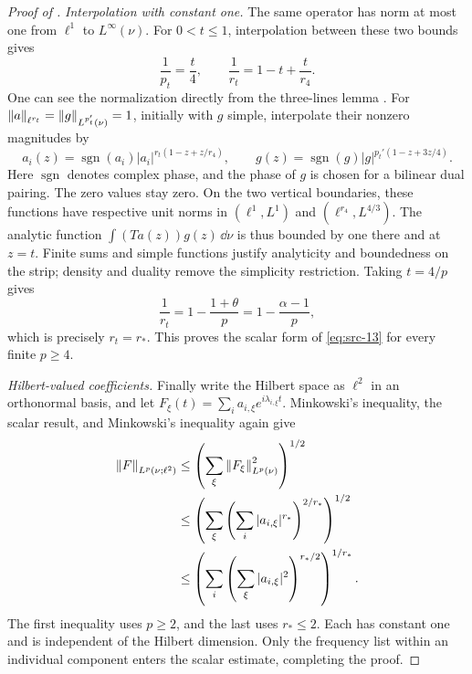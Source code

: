 \begin{proof}[Proof of ]
\emph{Interpolation with constant one.} The same
operator has norm at most one from \(\ell^1\) to \(L^\infty(\nu)\).
For \(0<t\le1\), interpolation between these two bounds gives
\[
 \frac1{p_t}=\frac t4,
 \qquad
 \frac1{r_t}=1-t+\frac t{r_4}.
\]
One can see the normalization directly from the three-lines lemma
\cite[Lemma~3.3, p.~57]{Hajlasz2012}.
For \(\left\|a\right\|_{\ell^{r_t}}=\left\|g\right\|_{L^{p_t'}(\nu)}=1\), initially
with \(g\) simple, interpolate their nonzero magnitudes by
\[
 a_i(z)=\operatorname{sgn}(a_i)
          |a_i|^{r_t(1-z+z/r_4)},
 \qquad
 g(z)=\operatorname{sgn}(g)
          |g|^{p_t'(1-z+3z/4)}.
\]
Here \(\operatorname{sgn}\) denotes complex phase, and the phase of
\(g\) is chosen for a bilinear dual pairing.  The zero values stay zero.
On the two vertical boundaries, these functions have respective unit
norms in \((\ell^1,L^1)\) and \((\ell^{r_4},L^{4/3})\).
The analytic function \(\int (Ta(z))g(z)\,\dd\nu\) is thus bounded by
one there and at \(z=t\).  Finite sums and simple functions justify
analyticity and boundedness on the strip; density and duality remove
the simplicity restriction.  Taking \(t=4/p\) gives
\[
 \frac1{r_t}
 =1-\frac{1+\theta}{p}
 =1-\frac{\alpha-1}{p},
\]
which is precisely \(r_t=r_*\).  This proves the scalar form of
\eqref{eq:src-13} for every finite \(p\ge4\).

\emph{Hilbert-valued coefficients.}
Finally write the Hilbert space as \(\ell^2\) in an orthonormal basis,
and let \(F_\xi(t)=\sum_i a_{i,\xi}e^{i\lambda_{i,\xi}t}\).
Minkowski's inequality, the scalar result, and Minkowski's inequality
again give
\begin{align*}
 \left\|F\right\|_{L^p(\nu;\ell^2)}
 &\le\left(\sum_\xi\left\|F_\xi\right\|_{L^p(\nu)}^2\right)^{1/2}\\
 &\le\left(\sum_\xi
          \left(\sum_i|a_{i,\xi}|^{r_*}\right)^{2/r_*}
            \right)^{1/2}\\
 &\le\left(\sum_i
          \left(\sum_\xi|a_{i,\xi}|^2\right)^{r_*/2}
            \right)^{1/r_*}.
\end{align*}
The first inequality uses \(p\ge2\), and the last uses \(r_*\le2\).
Each has constant one and is independent of the Hilbert dimension.
Only the frequency list within an individual component enters the
scalar estimate, completing the proof.
\end{proof}
